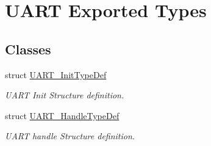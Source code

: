 \hypertarget{group___u_a_r_t___exported___types}{\section{U\-A\-R\-T Exported Types}
\label{group___u_a_r_t___exported___types}
}
\subsection*{Classes}
\begin{DoxyCompactItemize}
\item 
struct \hyperlink{struct_u_a_r_t___init_type_def}{U\-A\-R\-T\-\_\-\-Init\-Type\-Def}
\begin{DoxyCompactList}\small\item\em U\-A\-R\-T Init Structure definition. \end{DoxyCompactList}\item 
struct \hyperlink{struct_u_a_r_t___handle_type_def}{U\-A\-R\-T\-\_\-\-Handle\-Type\-Def}
\begin{DoxyCompactList}\small\item\em U\-A\-R\-T handle Structure definition. \end{DoxyCompactList}\end{DoxyCompactItemize}
